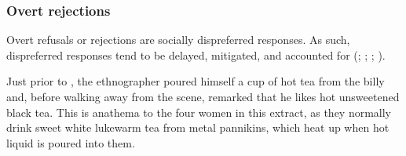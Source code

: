 \documentclass[output=paper,nonflat,colorlinks,citecolor=brown]{langsci/langscibook}
\begin{document}
\subsubsection{Overt rejections}

Overt refusals or rejections are socially dispreferred responses. As such, dispreferred responses tend to be delayed, mitigated, and accounted for (\citealt[265–80]{heritage1984garfinkel}; \citealt{Pomerantz1984agree}; \citealt[58–96]{Schegloff2007sequence}; \citealt{PomerantzHeritage2013}).

\hspace*{-.8mm}Just prior to , the ethnographer poured himself a cup of hot tea from the billy and, before walking away from the scene, remarked that he likes hot unsweetened black tea. This is anathema to the four women in this extract, as they normally drink sweet white lukewarm tea from metal pannikins, which heat up when hot liquid is poured into them.
\end{document}
